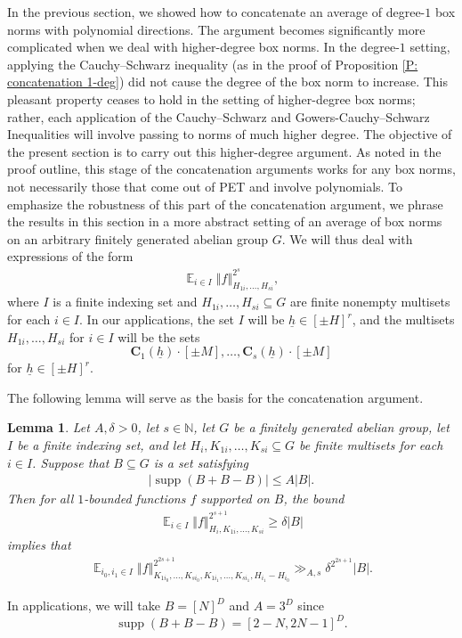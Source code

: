 \documentclass[11pt]{amsart}
\newtheorem{lemma}{Lemma}[section]
\theoremstyle{definition}
\DeclareMathOperator*{\E}{\mathbb{E}}
\newcommand{\N}{{\mathbb N}}
\newcommand{\bc}{{\textbf{C}}}
\newcommand{\uh}{{\underline{h}}}
\DeclareMathOperator{\supp}{supp}
\newcommand{\norm}[1]{\left\Vert #1\right\Vert}
\begin{document}
In the previous section, we showed how to concatenate an average of degree-$1$ box norms with polynomial directions. The argument becomes significantly more complicated when we deal with higher-degree box norms. In the degree-$1$ setting, applying the Cauchy--Schwarz inequality (as in the proof of Proposition \ref{P: concatenation 1-deg}) did not cause the degree of the box norm to increase. This pleasant property ceases to hold in the setting of higher-degree box norms; rather, each application of the Cauchy--Schwarz and Gowers-Cauchy--Schwarz Inequalities will involve passing to norms of much higher degree. The objective of the present section is to carry out this higher-degree argument. As noted in the proof outline, this stage of the concatenation arguments works for any box norms, not necessarily those that come out of PET and involve polynomials. To emphasize the robustness of this part of the concatenation argument, we phrase the results in this section in a more abstract setting of an average of box norms on an arbitrary finitely generated abelian group $G$.  We will thus deal with expressions of the form
\begin{align*}
    \E_{i\in I}\norm{f}_{H_{1i}, \ldots, H_{si}}^{2^s},
\end{align*}
where $I$ is a finite indexing set and 
$H_{1i}, \ldots, H_{si}\subseteq G$ are finite nonempty multisets for each $i \in I$. In our applications, the set $I$ will be $\uh\in[\pm H]^{r}$, and the {multisets} $H_{1i}, \ldots, H_{si}$ for $i\in I$ will be the sets $$\bc_1(\uh)\cdot[\pm M], \ldots, \bc_s(\uh)\cdot[\pm M]$$ for $\uh\in[\pm H]^r$.

The following lemma will serve as the basis for the concatenation argument.
\begin{lemma}\label{L: concatenation lemma}
    Let $A, \delta>0$, let $s\in\N$,
    let $G$ be a finitely generated abelian group, let $I$ be a finite indexing set, and let $H_i, K_{1i}, \ldots, K_{si}\subseteq G$ be finite multisets for each $i\in I$.  Suppose that $B \subseteq G$ is a set
    satisfying 
    \begin{align*}
        |\supp(B+B-B)|\leq A|B|.
    \end{align*}
Then for all $1$-bounded functions $f$ supported on $B$, the bound
    \begin{align*}
        {\E_{i\in I}\norm{f}_{H_i, K_{1i}, \ldots, K_{si}}^{2^{s+1}}}\geq \delta |B|
    \end{align*}
    implies that
    \begin{align*}
        \E_{i_0, i_1\in I}\norm{f}_{K_{1 i_0}, \ldots, K_{s i_0}, K_{1 i_1}, \ldots, K_{s i_1}, H_{i_1}-H_{i_0}}^{2^{2s+1}}\gg_{A, s} \delta^{2^{2s+1}} |B|.
    \end{align*}
\end{lemma}
In applications, we will take $B = [N]^D$ and $A=3^D$ since $$\supp(B+B - B) = [2-N, 2N-1]^D.$$ 
\end{document}
